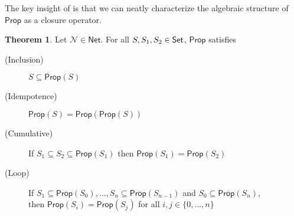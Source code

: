 \documentclass[letterpaper]{article}
\theoremstyle{definition}
\newtheorem{theorem}{Theorem}
\newcommand{\Set}{\mbox{\sf Set}}
\newcommand{\set}[1]{\{ #1 \}}
\newcommand{\Prop}{\textsf{Prop}}
\newcommand{\AllNets}{\mathsf{Net}}
\newcommand{\Net}{\mathcal{N}}
\begin{document}
The key insight of \citep{leitgeb2001nonmonotonic} is that we can neatly characterize the algebraic structure of $\Prop$ as a closure operator.

\begin{theorem}
\label{thm:prop-props}
Let $\Net \in \AllNets$.  For all $S, S_1, S_2 \in \Set$, $\Prop$ satisfies
\begin{description}
    \item[(Inclusion)] $S \subseteq \Prop(S)$
    
    \item[(Idempotence)] $\Prop(S) = \Prop(\Prop(S))$
    
    \item[(Cumulative)] If ${S_1 \subseteq S_2 \subseteq \Prop(S_1)}$ then ${\Prop(S_1) = \Prop(S_2)}$
    
    \item[(Loop)] If ${S_1 \subseteq \Prop(S_0)}, \ldots, {S_n \subseteq \Prop(S_{n-1})}$ and ${S_0 \subseteq \Prop(S_n)}$,\\ then ${\Prop(S_i) = \Prop(S_j)}$
    for all $i, j \in \set{0, \ldots, n}$
\end{description}
\end{theorem}
\end{document}
